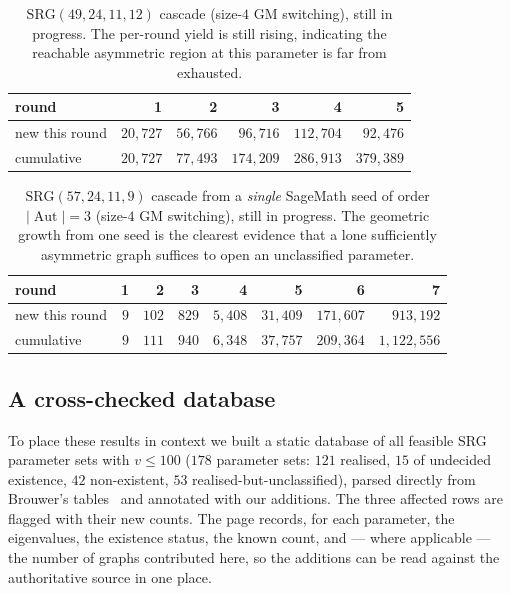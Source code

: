 \documentclass[11pt]{article}
\theoremstyle{definition}
\newcommand{\SRG}[1]{\mathrm{SRG}(#1)}
\newcommand{\Aut}{\operatorname{Aut}}
\begin{document}
\begin{table}[h]
\centering
\begin{tabular}{lrrrrr}
\toprule
round & 1 & 2 & 3 & 4 & 5 \\
\midrule
new this round & $20{,}727$ & $56{,}766$ & $96{,}716$ & $112{,}704$ & $92{,}476$ \\
cumulative & $20{,}727$ & $77{,}493$ & $174{,}209$ & $286{,}913$ & $379{,}389$ \\
\bottomrule
\end{tabular}
\caption{$\SRG{49,24,11,12}$ cascade (size-$4$ GM switching), still in progress. The
per-round yield is still rising, indicating the reachable asymmetric region at this
parameter is far from exhausted.}
\label{tab:casc49}
\end{table}

\begin{table}[h]
\centering
\begin{tabular}{lrrrrrrr}
\toprule
round & 1 & 2 & 3 & 4 & 5 & 6 & 7 \\
\midrule
new this round & $9$ & $102$ & $829$ & $5{,}408$ & $31{,}409$ & $171{,}607$ & $913{,}192$ \\
cumulative & $9$ & $111$ & $940$ & $6{,}348$ & $37{,}757$ & $209{,}364$ & $1{,}122{,}556$ \\
\bottomrule
\end{tabular}
\caption{$\SRG{57,24,11,9}$ cascade from a \emph{single} SageMath seed of order
$|\Aut|=3$ (size-$4$ GM switching), still in progress. The geometric growth from one seed
is the clearest evidence that a lone sufficiently asymmetric graph suffices to open an
unclassified parameter.}
\label{tab:casc57}
\end{table}

\subsection{A cross-checked database}

To place these results in context we built a static database of all feasible SRG
parameter sets with $v\le 100$ ($178$ parameter sets: $121$ realised, $15$ of undecided
existence, $42$ non-existent, $53$ realised-but-unclassified), parsed directly from
Brouwer's tables~\cite{brouwer-table} and annotated with our additions. The three affected
rows are flagged with their new counts. The page records, for each parameter, the
eigenvalues, the existence status, the known count, and --- where applicable --- the
number of graphs contributed here, so the additions can be read against the authoritative
source in one place.
\end{document}
